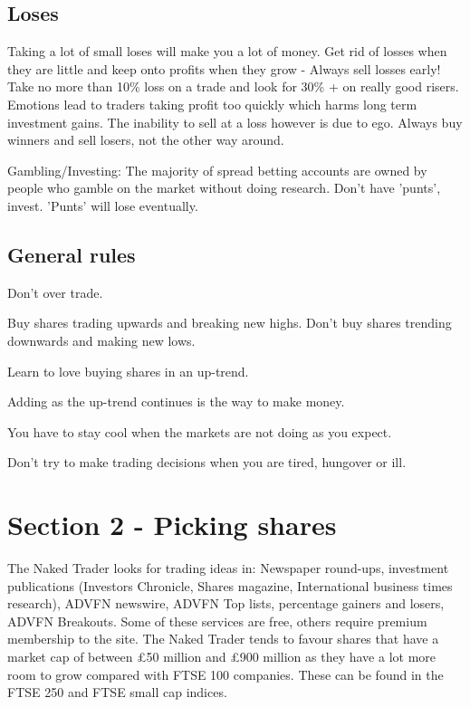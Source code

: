 \subsection*{Loses}
Taking a lot of small loses will make you a lot of money.
Get rid of losses when they are little and keep onto profits when they grow - Always sell losses early!
Take no more than 10\% loss on a trade and look for 30\% + on really good risers.
Emotions lead to traders taking profit too quickly which harms long term investment gains.
The inability to sell at a loss however is due to ego.
Always buy winners and sell losers, not the other way around.

Gambling/Investing: The majority of spread betting accounts are owned by people who gamble on the market without doing research.
Don't have 'punts', invest.
'Punts' will lose eventually.

\subsection*{General rules}
\begin{enumerate*}
\item Don't over trade.
\item Buy shares trading upwards and breaking new highs. Don't buy shares trending downwards and making new lows.
\item Learn to love buying shares in an up-trend.
\item Adding as the up-trend continues is the way to make money.
\item You have to stay cool when the markets are not doing as you expect.
\item Don't try to make trading decisions when you are tired, hungover or ill.
\end{enumerate*}

\section*{Section 2 - Picking shares}
The Naked Trader looks for trading ideas in: Newspaper round-ups, investment publications (Investors Chronicle, Shares magazine, International business times research), ADVFN newswire, ADVFN Top lists, percentage gainers and losers, ADVFN Breakouts. 
Some of these services are free, others require premium membership to the site.
The Naked Trader tends to favour shares that have a market cap of between \pounds 50 million and \pounds 900 million as they have a lot more room to grow compared with FTSE 100 companies.
These can be found in the FTSE 250 and FTSE small cap indices. 

